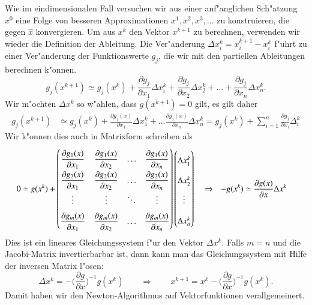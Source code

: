 Wie im eindimensionalen Fall versuchen wir aus einer anf"anglichen
Sch"atzung $x^{0}$ eine Folge von besseren Approximationen $x^1,
x^2,x^3,\dots$ zu konstruieren, die gegen $\hat{x}$ konvergieren.
Um aus $x^k$ den Vektor $x^{k+1}$ zu berechnen, verwenden wir wieder
die Definition der Ableitung.
Die Ver"anderung $\Delta x_i^k=x_i^{k+1}-x_i^k$ f"uhrt zu einer Ver"anderung
der Funktionswerte $g_j$, die wir mit den partiellen Ableitungen berechnen
k"onnen. 
\[
g_j(x^{k+1})
\simeq
g_j(x^k)
+ \frac{\partial g_j}{\partial x_1}\Delta x_i^k
+ \frac{\partial g_j}{\partial x_2}\Delta x_2^k
+ \dots 
+ \frac{\partial g_j}{\partial x_n}\Delta x_n^k.
\]
Wir m"ochten $\Delta x^k$ so w"ahlen, dass $g(x^{k+1})=0$ gilt,
es gilt daher
\begin{align*}
g_j(x^{k+1})
&\simeq
	g_j(x^k) + \frac{\partial g_j(x)}{\partial x_1}\Delta x_1^k + \dots
		\frac{\partial g_j(x)}{\partial x_n}\Delta x_n^k
	=g_j(x^k)+\sum_{i=1}^n\frac{\partial g_j}{\partial x_i}\Delta_i^k
\end{align*}
Wir k"onnen dies auch in Matrixform schreiben als
\begin{align*}
0&\simeq g(x^k) +
{\def\arraystretch{2}
\begin{pmatrix}
\displaystyle\frac{\partial g_1(x)}{\partial x_1}
	&\displaystyle\frac{\partial g_1(x)}{\partial x_2}
		&\dots
			&\displaystyle\frac{\partial g_1(x)}{\partial x_n}\\
\displaystyle\frac{\partial g_2(x)}{\partial x_1}
	&\displaystyle\frac{\partial g_2(x)}{\partial x_2}
		&\dots
			&\displaystyle\frac{\partial g_2(x)}{\partial x_n}\\
\vdots
	&\vdots
		&\ddots
			&\vdots\\
\displaystyle\frac{\partial g_m(x)}{\partial x_1}
	&\displaystyle\frac{\partial g_m(x)}{\partial x_2}
		&\dots
			&\displaystyle\frac{\partial g_m(x)}{\partial x_n}
\end{pmatrix}}
\begin{pmatrix}
\Delta x_1^k\\
\Delta x_2^k\\
\vdots\\
\Delta x_n^k
\end{pmatrix}
&&\Rightarrow&
-g(x^k)
&\simeq
\frac{\partial g(x)}{\partial x}\Delta x^k
\end{align*}
Dies ist ein lineares Gleichungssystem f"ur den Vektor $\Delta x^k$.
Falls $m=n$ und die Jacobi-Matrix invertierbarbar ist, dann kann
man das Gleichungssystem mit Hilfe der inversen Matrix l"osen:
\[
\Delta x^k =
-\biggl(\frac{\partial g}{\partial x}\biggr)^{-1} g(x^k)
\qquad
\Rightarrow
\qquad
x^{k+1}=x^k  -\biggl(\frac{\partial g}{\partial x}\biggr)^{-1} g(x^k).
\]
Damit haben wir den Newton-Algorithmus auf Vektorfunktionen verallgemeinert.

